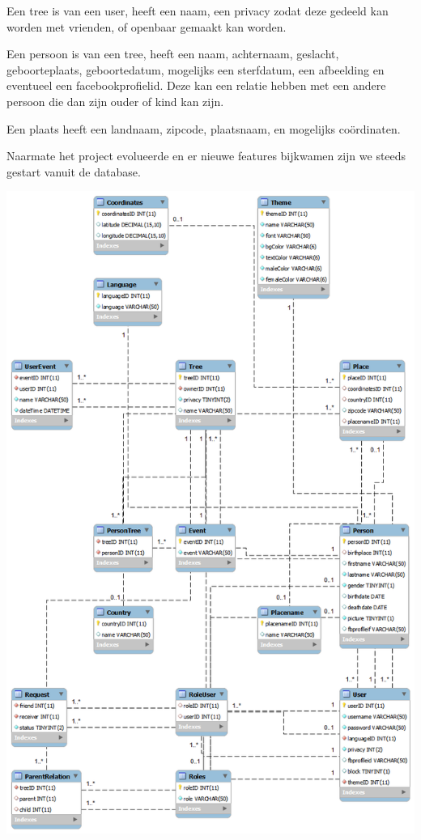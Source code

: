 \documentclass[pdftex,a4paper,12pt,twoside]{report}
\begin{document}
Een tree is van een user, heeft een naam, een privacy zodat deze gedeeld kan worden met vrienden, of openbaar gemaakt kan worden.

Een persoon is van een tree, heeft een naam, achternaam, geslacht, geboorteplaats,  geboortedatum, mogelijks een sterfdatum, een afbeelding en eventueel een facebookprofielid.  Deze kan een relatie hebben met een andere persoon die dan zijn ouder of kind kan zijn.

Een plaats heeft een landnaam, zipcode, plaatsnaam, en mogelijks coördinaten.

Naarmate het project evolueerde en er nieuwe features bijkwamen zijn we steeds gestart vanuit de database.

\includegraphics[width=\textwidth]{images/db.png}\\
\end{document}
